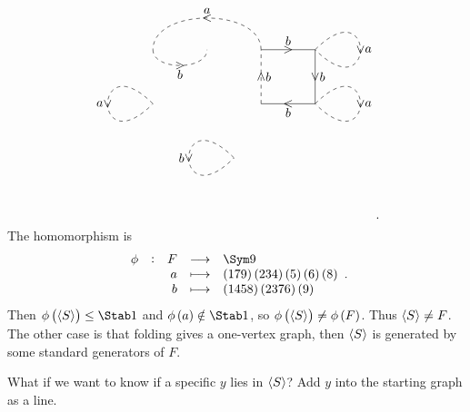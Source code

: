 \begin{example}
$$\begin{tikzpicture}[scale=1.5]
\draw (0, 1) to node{$ > $} node[above]{$ b $} (1, 1);
\draw (1, 1) to node{$ \vee $} node[right]{$ b $} (1, 0);
\draw (1, 0) to node{$ < $} node[below]{$ b $} (0, 0);
\draw [dashed] (0, 0) to node{$ \wedge $} node[right]{$ b $} (0, 1);
\draw [dashed] (-2, 1) to [in=-90, out=-90] node{$ > $} node[below]{$ b $} (-1, 1);
\draw [dashed] (0, 1) to [in=90, out=90] node{$ < $} node[above]{$ a $} (-2, 1);
\draw [dashed] (1, 1) to [in=-45, out=45, distance=45] node{$ \vee $} node[right]{$ a $} (1, 1);
\draw [dashed] (-2, 0) to [in=-135, out=135, distance=45] node{$ \vee $} node[left]{$ a $} (-2, 0);
\draw [dashed] (1, 0) to [in=-45, out=45, distance=45] node{$ \vee $} node[right]{$ a $} (1, 0);
\draw [dashed] (-0.5, -1) to [in=-135, out=135, distance=45] node{$ \vee $} node[left]{$ b $} (-0.5, -1);
\end{tikzpicture}.
$$
The homomorphism is
$$ \functions[\phi]{F}{\Sym 9}{a}{\br{179}\br{234}\br{5}\br{6}\br{8}}{b}{\br{1458}\br{2376}\br{9}}. $$
Then $ \phi\br{\abr{S}} \le \Stab 1 $ and $ \phi\br{a} \notin \Stab 1 $, so $ \phi\br{\abr{S}} \ne \phi\br{F} $. Thus $ \left\langle S \right\rangle \ne F $. The other case is that folding gives a one-vertex graph, then $ \left\langle S \right\rangle $ is generated by some standard generators of $ F $.
\end{example}

\pagebreak

What if we want to know if a specific $ y $ lies in $ \left\langle S \right\rangle $? Add $ y $ into the starting graph as a line.

